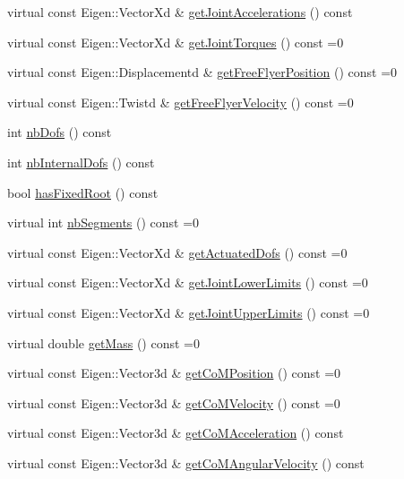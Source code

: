 \begin{DoxyCompactItemize}
virtual const Eigen\+::\+Vector\+Xd \& \hyperlink{classocra_1_1Model_acb5d3e56d76876bcf3377f53d67faef8}{get\+Joint\+Accelerations} () const 
\item 
virtual const Eigen\+::\+Vector\+Xd \& \hyperlink{classocra_1_1Model_a062fc08c456adf091e38ed1cfa5f0524}{get\+Joint\+Torques} () const =0
\item 
virtual const Eigen\+::\+Displacementd \& \hyperlink{classocra_1_1Model_a7549d8ca32c46a84ea4799730a81dae2}{get\+Free\+Flyer\+Position} () const =0
\item 
virtual const Eigen\+::\+Twistd \& \hyperlink{classocra_1_1Model_a0a11fff87a21ab37535420f7a7544c96}{get\+Free\+Flyer\+Velocity} () const =0
\item 
int \hyperlink{classocra_1_1Model_a250711de36aea05a24faed1ab288c5bc}{nb\+Dofs} () const 
\item 
int \hyperlink{classocra_1_1Model_a5a37483f12025315f7555efa8e70ca78}{nb\+Internal\+Dofs} () const 
\item 
bool \hyperlink{classocra_1_1Model_ad267c40d5046be08e3104f7ae685794c}{has\+Fixed\+Root} () const 
\item 
virtual int \hyperlink{classocra_1_1Model_acd57284b64bb5c05f4c2dac643476751}{nb\+Segments} () const =0
\item 
virtual const Eigen\+::\+Vector\+Xd \& \hyperlink{classocra_1_1Model_ad1a78d57aca4a4128c54d479f30afd82}{get\+Actuated\+Dofs} () const =0
\item 
virtual const Eigen\+::\+Vector\+Xd \& \hyperlink{classocra_1_1Model_ade47bb5ea3029b3d5652109d1ec6df7f}{get\+Joint\+Lower\+Limits} () const =0
\item 
virtual const Eigen\+::\+Vector\+Xd \& \hyperlink{classocra_1_1Model_a75caa887c8f27d8be8dc5a60ed1e1c41}{get\+Joint\+Upper\+Limits} () const =0
\item 
virtual double \hyperlink{classocra_1_1Model_a6237f96c89946f6c09be38761f128f28}{get\+Mass} () const =0
\item 
virtual const Eigen\+::\+Vector3d \& \hyperlink{classocra_1_1Model_a9c3b077772e4886299f613a71f8981e2}{get\+Co\+M\+Position} () const =0
\item 
virtual const Eigen\+::\+Vector3d \& \hyperlink{classocra_1_1Model_a567e950be5868080c250c40d8fc0c0ce}{get\+Co\+M\+Velocity} () const =0
\item 
virtual const Eigen\+::\+Vector3d \& \hyperlink{classocra_1_1Model_a6b65cba34b6d770d9818cf155716af4b}{get\+Co\+M\+Acceleration} () const 
\item 
virtual const Eigen\+::\+Vector3d \& \hyperlink{classocra_1_1Model_a60ca48c725e2d3dfe2ad0ca26ef3f94c}{get\+Co\+M\+Angular\+Velocity} () const 

\end{DoxyCompactItemize}
